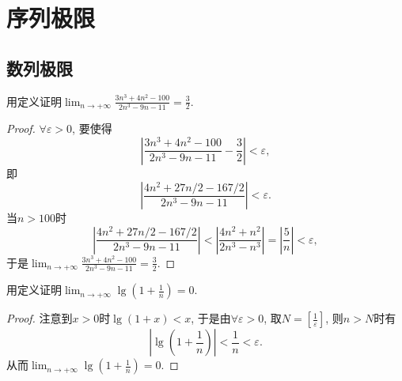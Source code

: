 \chapter{序列极限}
\section{数列极限}
\begin{quiza}
\woe  用定义证明\(\lim_{n\rightarrow +\infty}\frac{3n^3+4n^2-100}{2n^3-9n-11}=\frac{3}{2}.\)
\begin{proof}
\(\forall \varepsilon >0\), 要使得\[\left|\frac{3n^3+4n^2-100}{2n^3-9n-11}-\frac{3}{2}\right|<\varepsilon,\]即\[\left|\frac{4n^2+27n/2-167/2}{2n^3-9n-11}\right|<\varepsilon.\]当\(n>100\)时\[\left|\frac{4n^2+27n/2-167/2}{2n^3-9n-11}\right|<\left|\frac{4n^2+n^2}{2n^3-n^3}\right|=\left|\frac{5}{n}\right|<\varepsilon,\]于是\(\lim_{n\rightarrow +\infty}\frac{3n^3+4n^2-100}{2n^3-9n-11}=\frac{3}{2}\).
\end{proof}
\woe 用定义证明\(\lim_{n\rightarrow +\infty}\lg \left(1+\frac{1}{n}\right)=0.\)
\begin{proof}
注意到\(x>0\)时\(\lg(1+x)<x\), 于是由\(\forall \varepsilon>0\), 取\(N=\left[\frac{1}{\varepsilon}\right]\), 则\(n>N\)时有\[\left|\lg\left(1+\frac{1}{n}\right)\right|<\frac{1}{n}<\varepsilon.\]从而\(\lim_{n\rightarrow +\infty}\lg \left(1+\frac{1}{n}\right)=0.\)
\end{proof}
\end{quiza}

